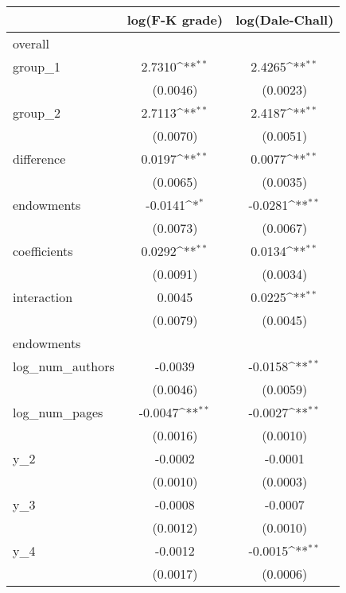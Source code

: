 {
\def\sym#1{\ifmmode^{#1}\else\(^{#1}\)\fi}
\begin{tabular}{l*{2}{c}}
\hline\hline
            &\multicolumn{1}{c}{log(F-K grade)}&\multicolumn{1}{c}{log(Dale-Chall)}\\
\hline
overall     &                    &                    \\
group\_1     &      2.7310\sym{**}&      2.4265\sym{**}\\
            &    (0.0046)        &    (0.0023)        \\
[1em]
group\_2     &      2.7113\sym{**}&      2.4187\sym{**}\\
            &    (0.0070)        &    (0.0051)        \\
[1em]
difference  &      0.0197\sym{**}&      0.0077\sym{**}\\
            &    (0.0065)        &    (0.0035)        \\
[1em]
endowments  &     -0.0141\sym{*} &     -0.0281\sym{**}\\
            &    (0.0073)        &    (0.0067)        \\
[1em]
coefficients&      0.0292\sym{**}&      0.0134\sym{**}\\
            &    (0.0091)        &    (0.0034)        \\
[1em]
interaction &      0.0045        &      0.0225\sym{**}\\
            &    (0.0079)        &    (0.0045)        \\
\hline
endowments  &                    &                    \\
log\_num\_authors&     -0.0039        &     -0.0158\sym{**}\\
            &    (0.0046)        &    (0.0059)        \\
[1em]
log\_num\_pages&     -0.0047\sym{**}&     -0.0027\sym{**}\\
            &    (0.0016)        &    (0.0010)        \\
[1em]
y\_2         &     -0.0002        &     -0.0001        \\
            &    (0.0010)        &    (0.0003)        \\
[1em]
y\_3         &     -0.0008        &     -0.0007        \\
            &    (0.0012)        &    (0.0010)        \\
[1em]
y\_4         &     -0.0012        &     -0.0015\sym{**}\\
            &    (0.0017)        &    (0.0006)        \\

\end{tabular}}
